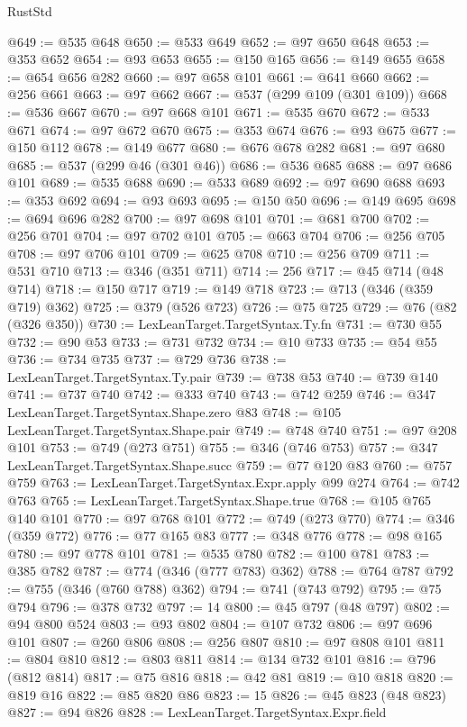\begin{lexlean}{RustStd}
\begin{coremodule}
@649 := @535 @648
@650 := @533 @649
@652 := @97 @650 @648
@653 := @353 @652
@654 := @93 @653
@655 := @150 @165
@656 := @149 @655
@658 := @654 @656 @282
@660 := @97 @658 @101
@661 := @641 @660
@662 := @256 @661
@663 := @97 @662
@667 := @537 (@299 @109 (@301 @109))
@668 := @536 @667
@670 := @97 @668 @101
@671 := @535 @670
@672 := @533 @671
@674 := @97 @672 @670
@675 := @353 @674
@676 := @93 @675
@677 := @150 @112
@678 := @149 @677
@680 := @676 @678 @282
@681 := @97 @680
@685 := @537 (@299 @46 (@301 @46))
@686 := @536 @685
@688 := @97 @686 @101
@689 := @535 @688
@690 := @533 @689
@692 := @97 @690 @688
@693 := @353 @692
@694 := @93 @693
@695 := @150 @50
@696 := @149 @695
@698 := @694 @696 @282
@700 := @97 @698 @101
@701 := @681 @700
@702 := @256 @701
@704 := @97 @702 @101
@705 := @663 @704
@706 := @256 @705
@708 := @97 @706 @101
@709 := @625 @708
@710 := @256 @709
@711 := @531 @710
@713 := @346 (@351 @711)
@714 := 256
@717 := @45 @714 (@48 @714)
@718 := @150 @717
@719 := @149 @718
@723 := @713 (@346 (@359 @719) @362)
@725 := @379 (@526 @723)
@726 := @75 @725
@729 := @76 (@82 (@326 @350))
@730 := LexLeanTarget.TargetSyntax.Ty.fn
@731 := @730 @55
@732 := @90 @53
@733 := @731 @732
@734 := @10 @733
@735 := @54 @55
@736 := @734 @735
@737 := @729 @736
@738 := LexLeanTarget.TargetSyntax.Ty.pair
@739 := @738 @53
@740 := @739 @140
@741 := @737 @740
@742 := @333 @740
@743 := @742 @259
@746 := @347 LexLeanTarget.TargetSyntax.Shape.zero @83
@748 := @105 LexLeanTarget.TargetSyntax.Shape.pair
@749 := @748 @740
@751 := @97 @208 @101
@753 := @749 (@273 @751)
@755 := @346 (@746 @753)
@757 := @347 LexLeanTarget.TargetSyntax.Shape.succ
@759 := @77 @120 @83
@760 := @757 @759
@763 := LexLeanTarget.TargetSyntax.Expr.apply @99 @274
@764 := @742 @763
@765 := LexLeanTarget.TargetSyntax.Shape.true
@768 := @105 @765 @140 @101
@770 := @97 @768 @101
@772 := @749 (@273 @770)
@774 := @346 (@359 @772)
@776 := @77 @165 @83
@777 := @348 @776
@778 := @98 @165
@780 := @97 @778 @101
@781 := @535 @780
@782 := @100 @781
@783 := @385 @782
@787 := @774 (@346 (@777 @783) @362)
@788 := @764 @787
@792 := @755 (@346 (@760 @788) @362)
@794 := @741 (@743 @792)
@795 := @75 @794
@796 := @378 @732
@797 := 14
@800 := @45 @797 (@48 @797)
@802 := @94 @800 @524
@803 := @93 @802
@804 := @107 @732
@806 := @97 @696 @101
@807 := @260 @806
@808 := @256 @807
@810 := @97 @808 @101
@811 := @804 @810
@812 := @803 @811
@814 := @134 @732 @101
@816 := @796 (@812 @814)
@817 := @75 @816
@818 := @42 @81
@819 := @10 @818
@820 := @819 @16
@822 := @85 @820 @86
@823 := 15
@826 := @45 @823 (@48 @823)
@827 := @94 @826
@828 := LexLeanTarget.TargetSyntax.Expr.field

\end{coremodule}
\end{lexlean}
